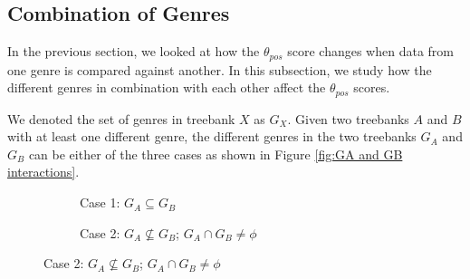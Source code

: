 \subsection{Combination of Genres}
\label{ssec:genres_combo}

In the previous section, we looked at how the $\theta_{pos}$ score changes when data from one genre is compared against another. In this subsection, we study how the different genres in combination with each other affect the $\theta_{pos}$ scores.

We denoted the set of genres in treebank $X$ as $G_{X}$. Given two treebanks $A$ and $B$ with at least one different genre, the different genres in the two treebanks $G_{A}$ and $G_{B}$ can be either of the three cases as shown in Figure \ref{fig:GA and GB interactions}.


\begin{figure}[H]
    \begin{subfigure}{.45\textwidth}
        \centering
        \caption{Case 1: $G_{A} \subseteq G_{B}$}
        \label{fig:case 1 ga gb}
    \end{subfigure}
    \begin{subfigure}{.5\textwidth}
        \centering
        \caption{Case 2: $G_{A} \not \subseteq G_{B}$; $G_{A} \cap G_{B} \neq \phi$}

\end{subfigure}
\end{figure}
